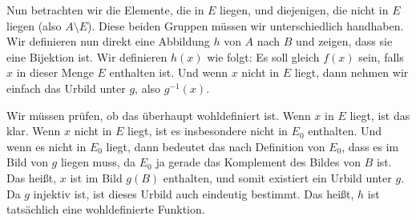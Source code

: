 \begin{spoken-clean}[00:27:30 - 00:29:10]
Nun betrachten wir die Elemente, die in $E$ liegen, und diejenigen, die nicht in $E$ liegen (also $A \setminus E$). Diese beiden Gruppen müssen wir unterschiedlich handhaben. Wir definieren nun direkt eine Abbildung $h$ von $A$ nach $B$ und zeigen, dass sie eine Bijektion ist. Wir definieren $h(x)$ wie folgt: Es soll gleich $f(x)$ sein, falls $x$ in dieser Menge $E$ enthalten ist. Und wenn $x$ nicht in $E$ liegt, dann nehmen wir einfach das Urbild unter $g$, also $g^{-1}(x)$.

Wir müssen prüfen, ob das überhaupt wohldefiniert ist. Wenn $x$ in $E$ liegt, ist das klar. Wenn $x$ nicht in $E$ liegt, ist es insbesondere nicht in $E_0$ enthalten. Und wenn es nicht in $E_0$ liegt, dann bedeutet das nach Definition von $E_0$, dass es im Bild von $g$ liegen muss, da $E_0$ ja gerade das Komplement des Bildes von $B$ ist. Das heißt, $x$ ist im Bild $g(B)$ enthalten, und somit existiert ein Urbild unter $g$. Da $g$ injektiv ist, ist dieses Urbild auch eindeutig bestimmt. Das heißt, $h$ ist tatsächlich eine wohldefinierte Funktion.
\end{spoken-clean}

